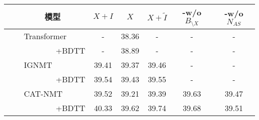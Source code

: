 \begin{table}[!htbp]
    \label{tab:5_product_data}
    \centering
    \footnotesize%
    \setlength{\tabcolsep}{4pt}%
    \renewcommand{\arraystretch}{1.2}%
    \begin{tabular}{l|ccc|c|c}
    \hline
    ~~~~~~~~模型 & $X+I$ & $X$ & $X+\tilde{I}$ & -w/o $B_{\setminus X}$ & -w/o $N_{AS}$ \\\hline
    
    ~~~~Transformer   & -     & 38.36 & - & - & - \\
    ~~~~~~~~~~~~+BDTT & -     & 38.89 & - & - & - \\\hline
    ~~~~IGNMT         & 39.41 & 39.37 & 39.46 & - & - \\
    ~~~~~~~~~~~~+BDTT & 39.54 & 39.43 & 39.55 & - & - \\\hline
    ~~~~CAT-NMT       & 39.52 & 39.21 & 39.39 & 39.63 & 39.47 \\
    ~~~~~~~~~~~~+BDTT & 40.33 & 39.62 & 39.74 & 39.68 & 39.51 \\
     \hline
    \end{tabular}%
\end{table}%

    
